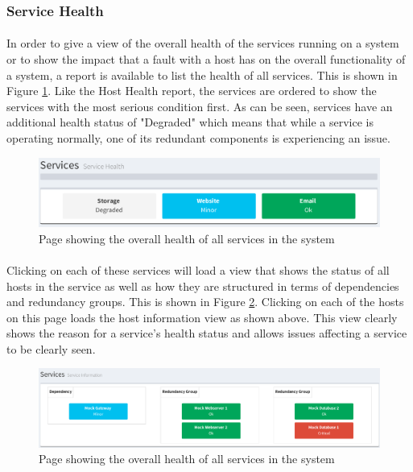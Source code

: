\documentclass[bsc,logo,twoside,singlespacing]{infthesis}
\begin{document}
\subsubsection{Service Health}
\paragraph*{}
	In order to give a view of the overall health of the services running on a
	system or to show the impact that a fault with a host has on the overall
	functionality of a system, a report is available to list the health of all
	services.  This is shown in Figure \ref{service-health-index}. Like the
	Host Health report, the services are ordered to show the services with the most
	serious condition first.  As can be seen, services have an additional health
	status of "Degraded" which means that while a service is operating normally,
	one of its redundant components is experiencing an issue.

\begin{figure}[H]
	\centering
	\caption{Page showing the overall health of all services in the system}
	\label{service-health-index}
	\includegraphics[scale=0.6]{assets/screenshots/service-health-index.pdf}
\end{figure}

\paragraph*{}
	Clicking on each of these services will load a view that shows the status of
	all hosts in the service as well as how they are structured in terms of
	dependencies and redundancy groups.  This is shown in Figure
	\ref{service-information}.  Clicking on each of the hosts on this page loads
	the host information view as shown above.  This view clearly shows the reason
	for a service's health status and allows issues affecting a service to be
	clearly seen.

\begin{figure}[H]
	\centering
	\caption{Page showing the overall health of all services in the system}
	\label{service-information}
	\includegraphics[scale=0.44]{assets/screenshots/service-information.pdf}
\end{figure}
\end{document}
